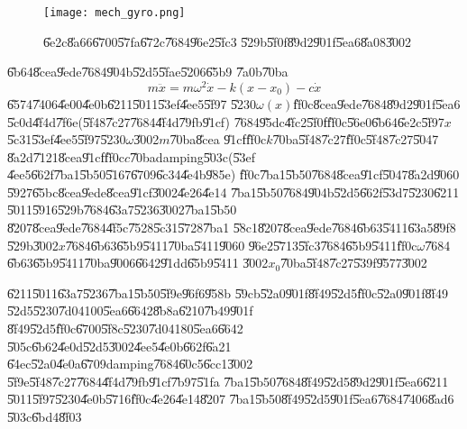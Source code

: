 \begin{center}
\begin{figure}[th]
\caption{\U{6e2c}\U{8a66}\U{6700}\U{57fa}\U{672c}\U{7684}\U{96e2}\U{5fc3}%
\U{529b}\U{5f0f}\U{89d2}\U{901f}\U{5ea6}\U{8a08}\U{3002}}
\begin{center}
\texttt{[image: mech\_gyro.png]}
\end{center}
\end{figure}
\end{center}

\U{6b64}\U{8cea}\U{9ede}\U{7684}\U{904b}\U{52d5}\U{5fae}\U{5206}\U{65b9}%
\U{7a0b}\U{70ba}%
\begin{equation*}
m\ddot{x}=m\omega ^{2}\dot{x}-k\left( x-x_{0}\right) -c\dot{x}
\end{equation*}%
\U{6574}\U{7406}\U{4e00}\U{4e0b}\U{6211}\U{5011}\U{53ef}\U{4ee5}\U{5f97}%
\U{5230}$\omega (x)$\U{ff0c}\U{8cea}\U{9ede}\U{7684}\U{89d2}\U{901f}\U{5ea6}%
\U{5c0d}\U{4f4d}\U{7f6e}(\U{5f48}\U{7c27}\U{7684}\U{4f4d}\U{79fb}\U{91cf})%
\U{7684}\U{95dc}\U{4fc2}\U{5f0f}\U{ff0c}\U{56e0}\U{6b64}\U{6e2c}\U{5f97}$x$%
\U{5c31}\U{53ef}\U{4ee5}\U{5f97}\U{5230}$\omega $\U{3002}$m$\U{70ba}\U{8cea}%
\U{91cf}\U{ff0c}$k$\U{70ba}\U{5f48}\U{7c27}\U{ff0c}\U{5f48}\U{7c27}\U{5047}%
\U{8a2d}\U{7121}\U{8cea}\U{91cf}\U{ff0c}$c$\U{70ba}damping\U{503c}(\U{53ef}%
\U{4ee5}\U{662f}\U{7ba1}\U{5b50}\U{5167}\U{6709}\U{6c34}\U{4e4b}\U{985e})%
\U{ff0c}\U{7ba1}\U{5b50}\U{7684}\U{8cea}\U{91cf}\U{5047}\U{8a2d}\U{9060}%
\U{5927}\U{65bc}\U{8cea}\U{9ede}\U{8cea}\U{91cf}\U{3002}\U{4e26}\U{4e14}%
\U{7ba1}\U{5b50}\U{7684}\U{904b}\U{52d5}\U{662f}\U{53d7}\U{5230}\U{6211}%
\U{5011}\U{5916}\U{529b}\U{7684}\U{63a7}\U{5236}\U{3002}\U{7ba1}\U{5b50}%
\U{8207}\U{8cea}\U{9ede}\U{7684}\U{4f5c}\U{7528}\U{5c31}\U{5728}\U{7ba1}%
\U{58c1}\U{8207}\U{8cea}\U{9ede}\U{7684}\U{6b63}\U{5411}\U{63a5}\U{89f8}%
\U{529b}\U{3002}$x$\U{7684}\U{6b63}\U{65b9}\U{5411}\U{70ba}\U{5411}\U{9060}%
\U{96e2}\U{5713}\U{5fc3}\U{7684}\U{65b9}\U{5411}\U{ff0c}$\omega $\U{7684}%
\U{6b63}\U{65b9}\U{5411}\U{70ba}\U{9006}\U{6642}\U{91dd}\U{65b9}\U{5411}%
\U{3002}$x_{0}$\U{70ba}\U{5f48}\U{7c27}\U{539f}\U{9577}\U{3002}

\U{6211}\U{5011}\U{63a7}\U{5236}\U{7ba1}\U{5b50}\U{5f9e}\U{96f6}\U{958b}%
\U{59cb}\U{52a0}\U{901f}\U{8f49}\U{52d5}\U{ff0c}\U{52a0}\U{901f}\U{8f49}%
\U{52d5}\U{5230}\U{7d04}100\U{5ea6}\U{6642}\U{8b8a}\U{6210}\U{7b49}\U{901f}%
\U{8f49}\U{52d5}\U{ff0c}\U{6700}\U{5f8c}\U{5230}\U{7d04}180\U{5ea6}\U{6642}%
\U{505c}\U{6b62}\U{4e0d}\U{52d5}\U{3002}\U{4ee5}\U{4e0b}\U{662f}\U{6a21}%
\U{64ec}\U{52a0}\U{4e0a}\U{6709}damping\U{7684}\U{60c5}\U{6cc1}\U{3002}%
\U{5f9e}\U{5f48}\U{7c27}\U{7684}\U{4f4d}\U{79fb}\U{91cf}\U{7b97}\U{51fa}%
\U{7ba1}\U{5b50}\U{7684}\U{8f49}\U{52d5}\U{89d2}\U{901f}\U{5ea6}\U{6211}%
\U{5011}\U{5f97}\U{5230}\U{4e0b}\U{5716}\U{ff0c}\U{4e26}\U{4e14}\U{8207}%
\U{7ba1}\U{5b50}\U{8f49}\U{52d5}\U{901f}\U{5ea6}\U{7684}\U{7406}\U{8ad6}%
\U{503c}\U{6bd4}\U{8f03}

